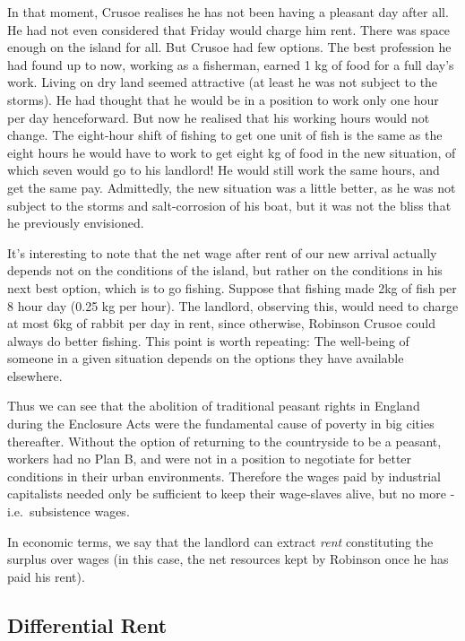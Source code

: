 \documentclass[]{tufte-handout}
\begin{document}
In that moment, Crusoe realises he has not been having a pleasant day
after all. He had not even considered that Friday would charge him rent.
There was space enough on the island for all. But Crusoe had few
options. The best profession he had found up to now, working as a
fisherman, earned 1 kg of food for a full day's work. Living on dry land
seemed attractive (at least he was not subject to the storms). He had
thought that he would be in a position to work only one hour per day
henceforward. But now he realised that his working hours would not
change. The eight-hour shift of fishing to get one unit of fish is the
same as the eight hours he would have to work to get eight kg of food in
the new situation, of which seven would go to his landlord! He would
still work the same hours, and get the same pay. Admittedly, the new
situation was a little better, as he was not subject to the storms and
salt-corrosion of his boat, but it was not the bliss that he previously
envisioned.

It's interesting to note that the net wage after rent of our new arrival
actually depends not on the conditions of the island, but rather on the
conditions in his next best option, which is to go fishing. Suppose that
fishing made 2kg of fish per 8 hour day (0.25 kg per hour). The
landlord, observing this, would need to charge at most 6kg of rabbit per
day in rent, since otherwise, Robinson Crusoe could always do better
fishing. This point is worth repeating: The well-being of someone in a
given situation depends on the options they have available elsewhere.

Thus we can see that the abolition of traditional peasant rights in
England during the Enclosure Acts were the fundamental cause of poverty
in big cities thereafter. Without the option of returning to the
countryside to be a peasant, workers had no Plan B, and were not in a
position to negotiate for better conditions in their urban environments.
Therefore the wages paid by industrial capitalists needed only be
sufficient to keep their wage-slaves alive, but no more -
i.e.~subsistence wages.

In economic terms, we say that the landlord can extract \emph{rent}
constituting the surplus over wages (in this case, the net resources
kept by Robinson once he has paid his rent).

\hypertarget{differential-rent}{%
\subsection{Differential Rent}\label{differential-rent}}
\end{document}
